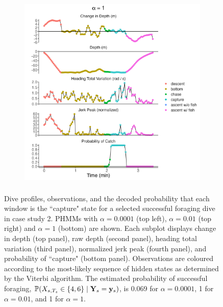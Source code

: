 \begin{figure}
    \begin{subfigure}[t]{0.9\textwidth}
        \centering
        \includegraphics[height = 3.75in]{plt/profile_delt_d_htv_jp_normed_0_4_pos_5975.png}
    \end{subfigure}
    \caption{Dive profiles, observations, and the decoded probability that each window is the ``capture" state for a selected successful foraging dive in case study 2. PHMMs with $\alpha = 0.0001$ (top left), $\alpha = 0.01$ (top right) and $\alpha = 1$ (bottom) are shown. Each subplot displays change in depth (top panel), raw depth (second panel), heading total variation (third panel), normalized jerk peak (fourth panel), and probability of ``capture" (bottom panel). Observations are coloured according to the most-likely sequence of hidden states as determined by the Viterbi algorithm. The estimated probability of successful foraging, $\mathbb{P}(X_{s,T_s} \in \{4,6\} \mid \mathbf{Y}_s = \mathbf{y}_s)$, is 0.069 for $\alpha = 0.0001$, 1 for $\alpha = 0.01$, and 1 for $\alpha = 1$.}
    \label{fig:profiles_5975}
\end{figure}

